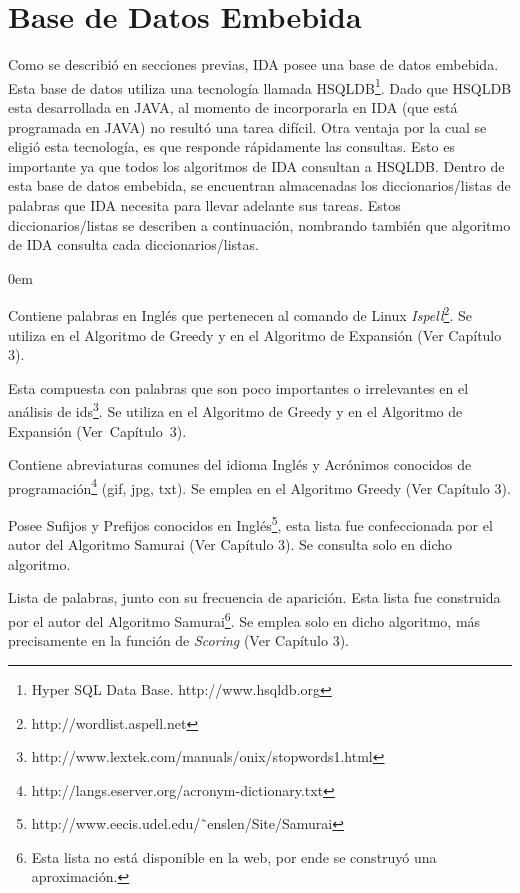 \section{Base de Datos Embebida}
\label{sec:bseEmb}

Como se describió en secciones previas, IDA posee una base de datos embebida. Esta base de datos utiliza una tecnología llamada HSQLDB\footnote[1]{Hyper SQL Data Base. http://www.hsqldb.org}. Dado que HSQLDB esta desarrollada en JAVA, al momento de incorporarla en IDA (que está programada en JAVA) no resultó una tarea difícil.
Otra ventaja por la cual se eligió esta tecnología, es que responde rápidamente las consultas. Esto es importante ya que todos los algoritmos de IDA consultan a HSQLDB. Dentro de esta base de datos embebida, se encuentran almacenadas los diccionarios/listas de palabras que IDA necesita para llevar adelante sus tareas. Estos diccionarios/listas se describen a continuación, nombrando también que algoritmo de IDA consulta cada diccionarios/listas.

\begin{description}
\itemsep0em%

\item[Diccionario en Inglés (ispell):] Contiene palabras en Inglés que pertenecen al comando de Linux \textit{Ispell}\footnote[2]{ http://wordlist.aspell.net}. Se utiliza en el Algoritmo de Greedy y en el Algoritmo de Expansión (Ver Capítulo 3).

\item[Lista de Palabras Excluyentes (stop-list):] Esta compuesta con palabras que son poco importantes o irrelevantes en el análisis de ids\footnote[3]{ http://www.lextek.com/manuals/onix/stopwords1.html}. Se utiliza en el Algoritmo de Greedy y en el Algoritmo de Expansión \mbox{(Ver Capítulo 3)}.

\item[Lista de Abreviaturas y Acrónimos Conocidas:] Contiene abreviaturas comunes del idioma Inglés y Acrónimos conocidos de programación\footnote[4]{http://langs.eserver.org/acronym-dictionary.txt} (gif, jpg, txt). Se emplea en el Algoritmo Greedy (Ver Capítulo 3).

\item[Lista de Prefijos y Sufijos Conocidos:] Posee Sufijos y Prefijos conocidos en Inglés\footnote[5]{http://www.eecis.udel.edu/˜enslen/Site/Samurai}, esta lista fue confeccionada por el autor del Algoritmo Samurai (Ver Capítulo 3). Se consulta solo en dicho algoritmo.
\pagebreak
\item[Frecuencias Globales de Palabras:] Lista de palabras, junto con su frecuencia de aparición. Esta lista fue construida por el autor del Algoritmo Samurai\footnote[1]{Esta lista no está disponible en la web, por ende se construyó una aproximación.}. Se emplea solo en dicho algoritmo, más precisamente en la función de \textit{Scoring} (Ver Capítulo 3).

\end{description}


